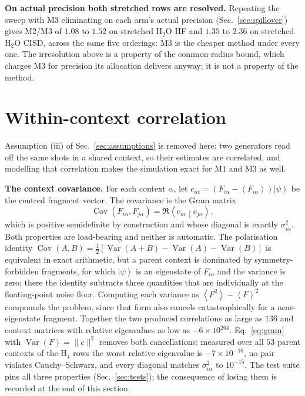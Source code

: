 \documentclass[10pt]{article}
\newcommand{\ket}[1]{\left|#1\right\rangle}
\newcommand{\expect}[1]{\left\langle #1 \right\rangle}
\newcommand{\Var}{\operatorname{Var}}
\newcommand{\Cov}{\operatorname{Cov}}
\begin{document}
\textbf{On actual precision both stretched rows are resolved.} Repeating the
sweep with M3 eliminating on each arm's actual precision
(Sec.~\ref{sec:spillover}) gives M2/M3 of $1.08$ to $1.52$ on stretched H$_2$O HF
and $1.35$ to $2.36$ on stretched H$_2$O CISD, across the same five orderings: M3
is the cheaper method under every one. The irresolution above is a property of
the common-radius bound, which charges M3 for precision its allocation delivers
anyway; it is not a property of the method.

\section{Within-context correlation}
\label{sec:correlation}

Assumption (iii) of Sec.~\ref{sec:assumptions} is removed here: two generators
read off the same shots in a shared context, so their estimates are correlated,
and modelling that correlation makes the simulation exact for M1 and M3 as well.

\textbf{The context covariance.} For each context $\alpha$, let
$c_{i\alpha}=\left(F_{i\alpha}-\expect{F_{i\alpha}}\right)\ket{\psi}$ be the
centred fragment vector. The covariance is the Gram matrix
\begin{equation}
  \Cov(F_{i\alpha},F_{j\alpha})=\Re\left\langle c_{i\alpha}\middle| c_{j\alpha}\right\rangle ,
  \label{eq:gram}
\end{equation}
which is positive semidefinite by construction and whose diagonal is exactly
$\sigma_{i\alpha}^2$. Both properties are load-bearing and neither is automatic.
The polarisation identity
$\Cov(A,B)=\tfrac12[\Var(A{+}B)-\Var(A)-\Var(B)]$ is equivalent in exact
arithmetic, but a parent context is dominated by symmetry-forbidden fragments, for
which $\ket{\psi}$ is an eigenstate of $F_{i\alpha}$ and the variance is zero; there
the identity subtracts three quantities that are individually at the floating-point
noise floor. Computing each variance as $\expect{F^2}-\expect{F}^2$ compounds the
problem, since that form also cancels catastrophically for a near-eigenstate
fragment. Together the two produced correlations as large as $136$ and context
matrices with relative eigenvalues as low as $-6\times10^{264}$. Eq.~\eqref{eq:gram}
with $\Var(F)=\|c\|^2$ removes both cancellations: measured over all $53$ parent
contexts of the H$_4$ rows the worst relative eigenvalue is $-7\times10^{-16}$, no
pair violates Cauchy--Schwarz, and every diagonal matches $\sigma_{i\alpha}^2$ to
$10^{-15}$. The test suite pins all three properties (Sec.~\ref{sec:tests}); the
consequence of losing them is recorded at the end of this section.
\end{document}
